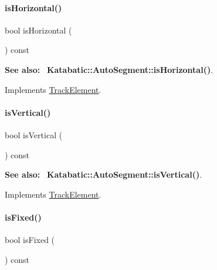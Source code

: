 \paragraph{\texorpdfstring{is\+Horizontal()}{isHorizontal()}}
{\footnotesize\ttfamily bool is\+Horizontal (\begin{DoxyParamCaption}{ }\end{DoxyParamCaption}) const\hspace{0.3cm}{\ttfamily [virtual]}}

{\bfseries See also\+:}~ \textbf{ Katabatic\+::\+Auto\+Segment\+::is\+Horizontal()}. 

Implements \mbox{\hyperlink{classKite_1_1TrackElement_a9d3db1f8a5aca58f8f54d291faebf873}{Track\+Element}}.

\mbox{\label{classKite_1_1TrackFixedSegment_abd54544ef1710ee4b67cfb021d73446c}} 
\paragraph{\texorpdfstring{is\+Vertical()}{isVertical()}}
{\footnotesize\ttfamily bool is\+Vertical (\begin{DoxyParamCaption}{ }\end{DoxyParamCaption}) const\hspace{0.3cm}{\ttfamily [virtual]}}

{\bfseries See also\+:}~ \textbf{ Katabatic\+::\+Auto\+Segment\+::is\+Vertical()}. 

Implements \mbox{\hyperlink{classKite_1_1TrackElement_a6fa2bf0568a2b295dd7cd1f7207247d5}{Track\+Element}}.

\mbox{\label{classKite_1_1TrackFixedSegment_afd7362b850709bed8b61c1aa22399f97}} 
\paragraph{\texorpdfstring{is\+Fixed()}{isFixed()}}
{\footnotesize\ttfamily bool is\+Fixed (\begin{DoxyParamCaption}{ }\end{DoxyParamCaption}) const\hspace{0.3cm}{\ttfamily [virtual]}}

